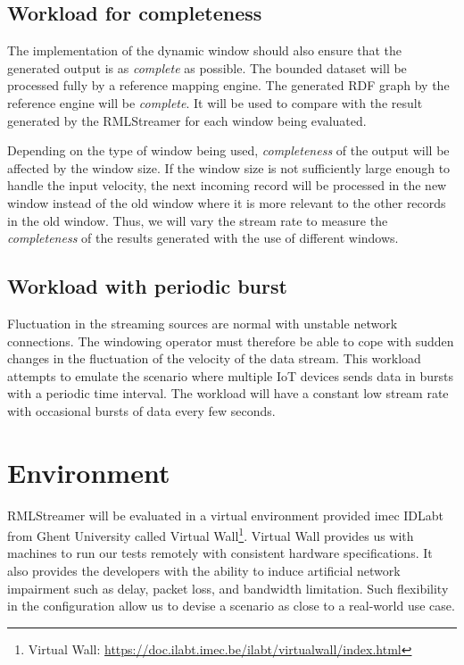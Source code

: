 \subsection{Workload for completeness}
The implementation of the dynamic window should also ensure that the generated 
output is as \emph{complete} as possible. The bounded dataset will be processed fully by 
a reference mapping engine. The generated RDF graph by the reference 
engine will be \emph{complete}. It will be used to compare with the result 
generated by the RMLStreamer for each window being evaluated. 

Depending on the type of window being used, \emph{completeness} of the output will be
affected by the window size. If the window size is not sufficiently large enough to handle 
the input velocity, the next incoming record will be processed in the new window instead of 
the old window where it is more relevant to the other records in the old window. Thus, 
we will vary the stream rate to measure the \emph{completeness} of the results generated 
with the use of different windows.

\subsection{Workload with periodic burst}
Fluctuation in the streaming sources are normal with unstable network connections. 
The windowing operator must therefore be able to cope with sudden changes in the 
fluctuation of the velocity of the data stream. This workload attempts to emulate 
the scenario where multiple IoT devices sends data in bursts with a periodic 
time interval. The workload will have a constant low stream rate with occasional 
bursts of data every few seconds. 


\section{Environment}

RMLStreamer will be evaluated in a virtual environment provided imec IDLabt from Ghent 
University called Virtual Wall\footnote{Virtual Wall: \href{https://doc.ilabt.imec.be/ilabt/virtualwall/index.html}{https://doc.ilabt.imec.be/ilabt/virtualwall/index.html}}.
Virtual Wall provides us with machines to run our tests remotely with consistent 
hardware specifications. It also provides the developers with the ability to induce 
artificial network impairment such as delay, packet loss, and bandwidth limitation. Such 
flexibility in the configuration allow us to devise a scenario as close to a real-world use case. 

